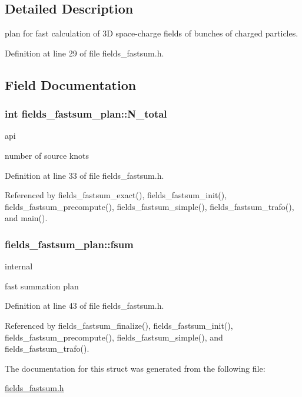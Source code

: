 \subsection{Detailed Description}
plan for fast calculation of 3D space-charge fields of bunches of charged particles. 

Definition at line 29 of file fields\_\-fastsum.h.

\subsection{Field Documentation}
\hypertarget{structfields__fastsum__plan_9e6c7fdded131315c670e971b29fb5e0}{
\subsubsection{\setlength{\rightskip}{0pt plus 5cm}int {\bf fields\_\-fastsum\_\-plan::N\_\-total}}}
\label{structfields__fastsum__plan_9e6c7fdded131315c670e971b29fb5e0}


api 

number of source knots 

Definition at line 33 of file fields\_\-fastsum.h.

Referenced by fields\_\-fastsum\_\-exact(), fields\_\-fastsum\_\-init(), fields\_\-fastsum\_\-precompute(), fields\_\-fastsum\_\-simple(), fields\_\-fastsum\_\-trafo(), and main().\hypertarget{structfields__fastsum__plan_3d6cdb7e962a19abec6faa6e532e2745}{
\subsubsection{ {\bf fields\_\-fastsum\_\-plan::fsum}}}
\label{structfields__fastsum__plan_3d6cdb7e962a19abec6faa6e532e2745}


internal 

fast summation plan 

Definition at line 43 of file fields\_\-fastsum.h.

Referenced by fields\_\-fastsum\_\-finalize(), fields\_\-fastsum\_\-init(), fields\_\-fastsum\_\-precompute(), fields\_\-fastsum\_\-simple(), and fields\_\-fastsum\_\-trafo().

The documentation for this struct was generated from the following file:\begin{CompactItemize}
\item 
\hyperlink{fields__fastsum_8h}{fields\_\-fastsum.h}\end{CompactItemize}

